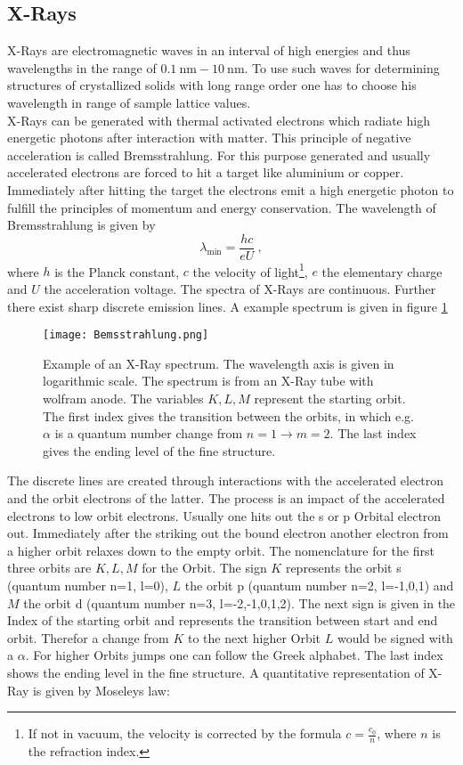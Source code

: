 \subsection{X-Rays}
	X-Rays are electromagnetic waves in an interval of high energies and thus wavelengths in the range of $\SI{0.1}{\nano\metre}-\SI{10}{\nano\metre}$. To use such waves for determining structures of crystallized solids with long range order one has to choose his wavelength in range of sample lattice values.\\
	X-Rays can be generated with thermal activated electrons which radiate high energetic photons after interaction with matter. This principle of negative acceleration is called Bremsstrahlung. For this purpose generated and usually accelerated electrons are forced to hit a target like aluminium or copper. Immediately after hitting the target the electrons emit a high energetic photon to fulfill the principles of momentum and energy conservation. The wavelength of Bremsstrahlung is given by
	\begin{equation}
		\lambda_\text{min}=\frac{hc}{eU}~\mathrm{,}
	\end{equation}
	where $h$ is the Planck constant, $c$ the velocity of light\footnote{If not in vacuum, the velocity is corrected by the formula  $c=\frac{c_0}{n}$, where $n$ is the refraction index.}, $e$ the elementary charge and $U$ the acceleration voltage. 
	The spectra of X-Rays are continuous. Further there exist sharp discrete emission lines. A example spectrum is given in figure \ref{Bremsspektrum}
	\begin{figure}[h]
		\centering
		\texttt{[image: Bemsstrahlung.png]}
		\caption[Example of an X-Ray spectrum]{Example of an X-Ray spectrum. The wavelength axis is given in logarithmic scale. The spectrum is from an X-Ray tube with wolfram anode. The variables $K,L,M$ represent the starting orbit. The first index gives the transition between the orbits, in which e.g. $\alpha$ is a quantum number change from $n=1\to m=2$. The last index gives the ending level of the fine structure. \cite{lit:GroMa14}}
		\label{Bremsspektrum}
	\end{figure}
	The discrete lines are created through interactions with the accelerated electron and the orbit electrons of the latter. The process is an impact of the accelerated electrons to low orbit electrons. Usually one hits out the s or p Orbital electron out. Immediately after the striking out the bound electron another electron from a higher orbit relaxes down to the empty orbit. The nomenclature for the first three orbits are $K, L, M$ for the Orbit. The sign $K$ represents the orbit s (quantum number n=1, l=0), $L$ the orbit p (quantum number n=2, l=-1,0,1) and $M$ the orbit d (quantum number n=3, l=-2,-1,0,1,2). The next sign is given in the Index of the starting orbit and represents the transition between start and end orbit. Therefor a change from $K$ to the next higher Orbit $L$ would be signed with a $\alpha$. For higher Orbits jumps one can follow the Greek alphabet. The last index shows the ending level in the fine structure. A quantitative representation of X-Ray is given by Moseleys law:

